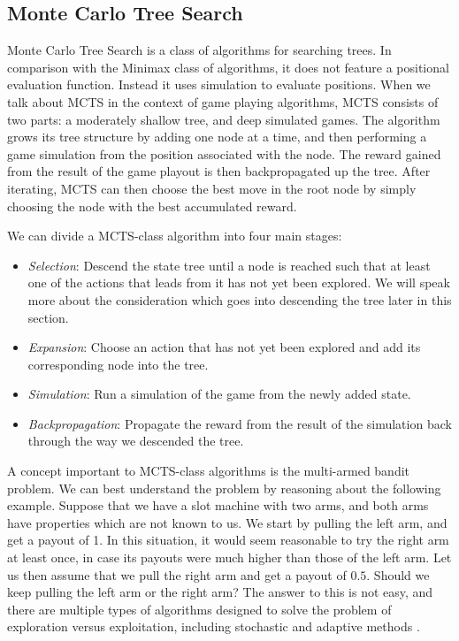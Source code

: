 \subsection{Monte Carlo Tree Search}
\label{rw:mcts}

Monte Carlo Tree Search \cite{Chaslot10} is a class of algorithms for searching trees.
In comparison with the Minimax class of algorithms, it does not feature
a positional evaluation function. Instead it uses simulation to evaluate positions.
When we talk about MCTS in the context of game playing algorithms, MCTS
consists of two parts: a moderately shallow tree, and deep simulated games.
The algorithm grows its tree structure by adding one node at a time, and then
performing a game simulation from the position associated with the node.
The reward gained from the result of the game playout is then backpropagated
up the tree. After iterating, MCTS can then choose the best move in the root
node by simply choosing the node with the best accumulated reward.

We can divide a MCTS-class algorithm into four main stages:
\begin{itemize}
    \item \emph{Selection}: Descend the state tree until a node is reached
        such that at least one of the actions that leads from it has not
        yet been explored. We will speak more about the consideration which
        goes into descending the tree later in this section.
    \item \emph{Expansion}: Choose an action that has not yet been explored
        and add its corresponding node into the tree.
    \item \emph{Simulation}: Run a simulation of the game from the newly
        added state.
    \item \emph{Backpropagation}: Propagate the reward from the result
        of the simulation back through the way we descended the tree.
\end{itemize}

A concept important to MCTS-class algorithms is the multi-armed bandit problem.
We can best understand the problem by reasoning about the following example.
Suppose that we have a slot machine with two arms, and both arms have properties
which are not known to us. We start by pulling the left arm, and get a payout
of 1. In this situation, it would seem reasonable to try the right arm at least once,
in case its payouts were much higher than those of the left arm. Let us then assume that
we pull the right arm and get a payout of $0.5$. Should we keep pulling the left arm
or the right arm? The answer to this is not easy, and there are multiple types
of algorithms designed to solve the problem of exploration versus exploitation,
including stochastic and adaptive methods \cite{Slivkins19}.

